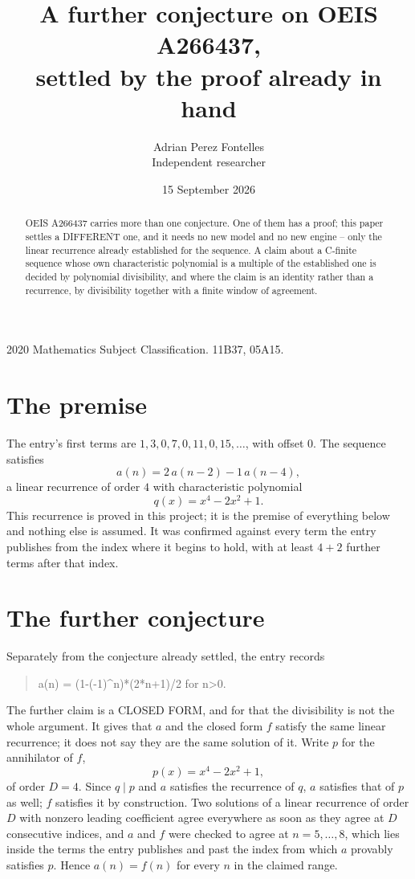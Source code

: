 \documentclass[11pt,a4paper]{article}
\title{A further conjecture on OEIS A266437,\\ \large settled by the proof already in hand}
\author{Adrian Perez Fontelles\\ \small Independent researcher}
\date{15 September 2026}
\theoremstyle{plain}
\theoremstyle{definition}
\begin{document}
\maketitle

\begin{abstract}
OEIS A266437 carries more than one conjecture. One of them has a proof; this paper settles a
DIFFERENT one, and it needs no new model and no new engine -- only the linear recurrence already
established for the sequence. A claim about a C-finite sequence whose own characteristic
polynomial is a multiple of the established one is decided by polynomial divisibility, and where
the claim is an identity rather than a recurrence, by divisibility together with a finite window
of agreement.
\end{abstract}

\noindent\small 2020 Mathematics Subject Classification. 11B37, 05A15.\normalsize

\section{The premise}

The entry's first terms are $1, 3, 0, 7, 0, 11, 0, 15,\dots$, with offset $0$. The sequence satisfies
\[
  a(n)=2\,a(n-2) - 1\,a(n-4) ,
\]
a linear recurrence of order $4$ with characteristic polynomial
\[
  q(x)=x^{4} - 2 x^{2} + 1 .
\]
This recurrence is proved in this project; it is the premise of everything below and nothing else is assumed.
It was confirmed against every term the entry publishes from the index where it begins to hold,
with at least $4+2$ further terms after that index.

\section{The further conjecture}

Separately from the conjecture already settled, the entry records

\begin{quote}\raggedright a(n) = (1-(-1)\^{}n)*(2*n+1)/2 for n>0.\end{quote}

The further claim is a CLOSED FORM, and for that the divisibility is not the whole argument. It
gives that $a$ and the closed form $f$ satisfy the same linear recurrence; it does not say they
are the same solution of it. Write $p$ for the annihilator of $f$,
\[
  p(x)=x^{4} - 2 x^{2} + 1 ,
\]
of order $D=4$. Since $q\mid p$ and $a$ satisfies the recurrence of $q$, $a$ satisfies that of
$p$ as well; $f$ satisfies it by construction. Two solutions of a linear recurrence of order $D$
with nonzero leading coefficient agree everywhere as soon as they agree at $D$ consecutive
indices, and $a$ and $f$ were checked to agree at $n=5,\dots,8$,
which lies inside the terms the entry publishes and past the index from which $a$ provably
satisfies $p$. Hence $a(n)=f(n)$ for every $n$ in the claimed range.
\end{document}
